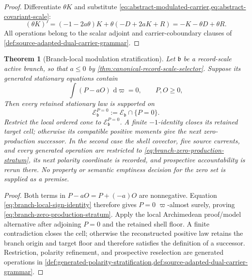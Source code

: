 \documentclass[11pt]{article}
\numberwithin{section}{part}
\theoremstyle{plain}
\newtheorem{theorem}{Theorem}[section]
\theoremstyle{definition}
\theoremstyle{remark}
\newcommand{\dd}{\,\mathrm d}
\begin{document}
\begin{proof}
Differentiate \(\theta K\) and substitute
\cref{eq:abstract-modulated-carrier,eq:abstract-covariant-scale}:
\[
 (\theta K)'=(-1-2a\theta)K
 +\theta(-D+2aK+R)=-K-\theta D+\theta R.
\]
All operations belong to the scalar adjoint and carrier-coboundary clauses of
\cref{def:source-adapted-dual-carrier-grammar}.
\end{proof}

\begin{theorem}[Branch-local modulation stratification]
\label{thm:branch-local-modulation-reduction}
Let \(\mathfrak b\) be a record-scale active branch, so that \(a\le0\) by
\cref{thm:canonical-record-scale-selector}.  Suppose its generated
stationary equations contain
\begin{equation}
 \label{eq:branch-local-sign-identity}
 \int(P-aO)\,\dd\varpi=0,
 \qquad P,O\ge0,
\end{equation}
Then every retained stationary law is supported on
\begin{equation}
 \label{eq:branch-zero-production-stratum}
 \mathcal E_{\mathfrak b}^{P=0}
 :=\mathcal E_{\mathfrak b}\cap\{P=0\}.
\end{equation}
Restrict the local ordered cone to
\(\mathcal E_{\mathfrak b}^{P=0}\).  A finite \(-1\)-identity closes its
retained target cell; otherwise its compatible positive moments give the
next zero-production successor.  In the second case the shell covector, five
source currents, and every generated operation are restricted to
\eqref{eq:branch-zero-production-stratum}, its next polarity coordinate is
recorded, and prospective accountability is rerun there.  No property or
semantic emptiness decision for the zero set is supplied as a premise.
\end{theorem}

\begin{proof}
Both terms in \(P-aO=P+(-a)O\) are nonnegative.  Equation
\eqref{eq:branch-local-sign-identity} therefore gives \(P=0\)
\(\varpi\)-almost surely, proving
\eqref{eq:branch-zero-production-stratum}.  Apply the local Archimedean
proof/model alternative after adjoining \(P=0\) and the retained shell floor.
A finite contradiction closes the cell; otherwise the reconstructed positive
law retains the branch origin and target floor and therefore satisfies the
definition of a successor.  Restriction, polarity refinement, and prospective
reselection are generated operations in
\cref{def:generated-polarity-stratification,def:source-adapted-dual-carrier-grammar}.
\end{proof}
\end{document}
